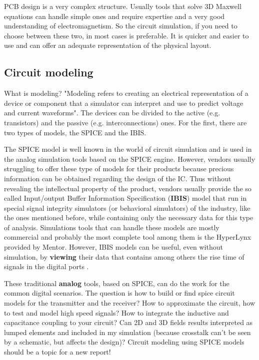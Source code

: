 \documentclass[final]{cubedoc}
\begin{document}
	PCB design is a very complex structure. Usually tools that solve 3D Maxwell equations can handle simple ones and require expertise and a very good understanding of electromagnetism. So the circuit simulation, if you need to choose between these two, in most cases is preferable. It is quicker and easier to use and can offer an adequate representation of the physical layout.
	
	
	\subsection{Circuit modeling}
	
	What is modeling? "Modeling refers to creating an electrical representation of a device or component that a simulator can interpret and use to predict voltage and current waveforms". The devices can be divided to the active (e.g. transistors) and the passive (e.g. interconnections) ones. For the first, there are two types of models, the SPICE and the IBIS.
	
	The SPICE model is well known in the world of circuit simulation and is used in the analog simulation tools based on the SPICE engine. However, vendors usually struggling to offer these type of models for their products because precious information can be obtained regarding the design of the IC. Thus without revealing the intellectual property of the product, vendors usually provide the so called Input/output Buffer Information Specification (\textbf{IBIS}) model that run in special signal integrity simulators (or behavioral simulators) of the industry, like the ones mentioned before, while containing only the necessary data for this type of analysis. Simulations tools that can handle these models are mostly commercial and probably the most complete tool among them is the HyperLynx provided by Mentor.
	However, IBIS models can be useful, even without simulation, by \textbf{viewing} their data that contains among others the rise time of signals in the digital ports \cite{bogatin2009signal}.
	
	These traditional \textbf{analog} tools, based on SPICE, can do the work for the common digital scenarios. The question is how to build or find spice circuit models for the transmitter and the receiver? How to approximate the circuit, how to test and model high speed signals? How to integrate the inductive and capacitance coupling to your circuit? Can 2D and 3D fields results interpreted as lumped elements and included in my simulation (because crosstalk can't be seen by a schematic, but affects the design)? Circuit modeling using SPICE models should be a topic for a new report!
	
\end{document}
